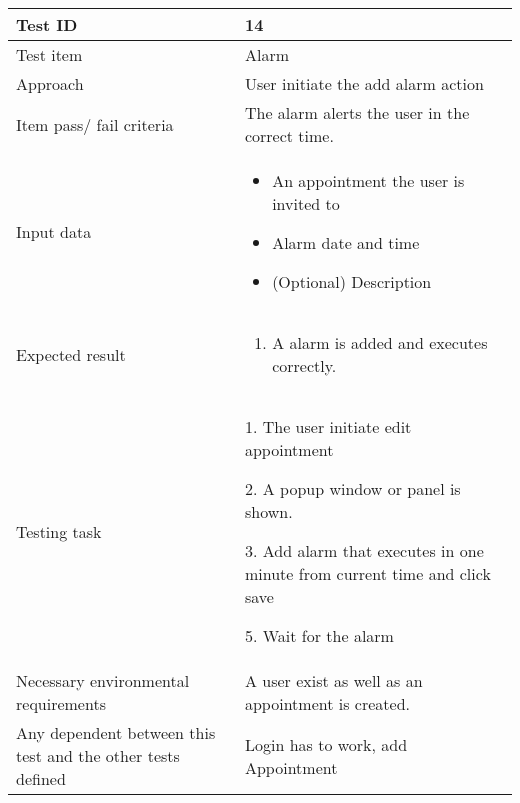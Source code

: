 \documentclass[a4paper, 10pt]{article}
\begin{document}
\begin{tabularx}{\textwidth}{ |X|X| }
\hline
\rowcolor{Gray}
Test ID & 14 \\ \hline
Test item & Alarm \\ \hline
Approach & User initiate the add alarm action \\ \hline
Item pass/ fail criteria & The alarm alerts the user in the correct time.\\ \hline
Input data & 
\begin{itemize}
	\item An appointment the user is invited to
	\item Alarm date and time
	\item (Optional) Description
\end{itemize}\\ \hline
Expected result & 
\begin{enumerate}
	\item A alarm is added and executes correctly.
\end{enumerate} \\ \hline
Testing task &
\begin{task steps}
	\item 1. The user initiate edit appointment
	\item 2. A popup window or panel is shown. 
	\item 3. Add alarm that executes in one minute from current time and click save
	\item 5. Wait for the alarm
\end{task steps}	\\ \hline
Necessary environmental requirements & A user exist as well as an appointment is created.   \\ \hline
Any dependent between this test and the other tests defined & Login has to work, add Appointment  \\ \hline

\end{tabularx}
\end{document}
